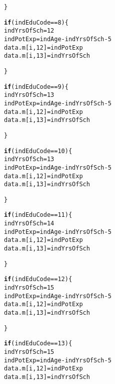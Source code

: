 \documentclass{article}\usepackage[]{graphicx}\usepackage[]{color}
\makeatletter
\newcommand{\hlnum}[1]{\textcolor[rgb]{0.686,0.059,0.569}{#1}}%
\newcommand{\hlopt}[1]{\textcolor[rgb]{0,0,0}{#1}}%
\newcommand{\hlstd}[1]{\textcolor[rgb]{0.345,0.345,0.345}{#1}}%
\newcommand{\hlkwa}[1]{\textcolor[rgb]{0.161,0.373,0.58}{\textbf{#1}}}%
\newcommand{\hlkwb}[1]{\textcolor[rgb]{0.69,0.353,0.396}{#1}}%
\newenvironment{kframe}{%
 \def\at@end@of@kframe{}%
 \ifinner\ifhmode%
  \def\at@end@of@kframe{\end{minipage}}%
  \begin{minipage}{\columnwidth}%
 \fi\fi%
 \def\FrameCommand##1{\hskip\@totalleftmargin \hskip-\fboxsep
 \colorbox{shadecolor}{##1}\hskip-\fboxsep
     \hskip-\linewidth \hskip-\@totalleftmargin \hskip\columnwidth}%
 \MakeFramed {\advance\hsize-\width
   \@totalleftmargin\z@ \linewidth\hsize
   \@setminipage}}%
 {\par\unskip\endMakeFramed%
 \at@end@of@kframe}
\newenvironment{knitrout}{}{} %
\makeatother
\begin{document}
\begin{knitrout}
\begin{kframe}
\begin{alltt}
    \hlstd{\}}

    \hlkwa{if} \hlstd{(indEduCode} \hlopt{==} \hlnum{8}\hlstd{)\{}
      \hlstd{indYrsOfSch} \hlkwb{=} \hlnum{12}
      \hlstd{indPotExp} \hlkwb{=} \hlstd{indAge} \hlopt{-} \hlstd{indYrsOfSch} \hlopt{-} \hlnum{5}
      \hlstd{data.m[i,}\hlnum{12}\hlstd{]} \hlkwb{=} \hlstd{indPotExp}
      \hlstd{data.m[i,}\hlnum{13}\hlstd{]} \hlkwb{=} \hlstd{indYrsOfSch}

    \hlstd{\}}

    \hlkwa{if} \hlstd{(indEduCode} \hlopt{==} \hlnum{9}\hlstd{)\{}
      \hlstd{indYrsOfSch} \hlkwb{=} \hlnum{13}
      \hlstd{indPotExp} \hlkwb{=} \hlstd{indAge} \hlopt{-} \hlstd{indYrsOfSch} \hlopt{-} \hlnum{5}
      \hlstd{data.m[i,}\hlnum{12}\hlstd{]} \hlkwb{=} \hlstd{indPotExp}
      \hlstd{data.m[i,}\hlnum{13}\hlstd{]} \hlkwb{=} \hlstd{indYrsOfSch}

    \hlstd{\}}

    \hlkwa{if} \hlstd{(indEduCode} \hlopt{==} \hlnum{10}\hlstd{)\{}
      \hlstd{indYrsOfSch} \hlkwb{=} \hlnum{13}
      \hlstd{indPotExp} \hlkwb{=} \hlstd{indAge} \hlopt{-} \hlstd{indYrsOfSch} \hlopt{-} \hlnum{5}
      \hlstd{data.m[i,}\hlnum{12}\hlstd{]} \hlkwb{=} \hlstd{indPotExp}
      \hlstd{data.m[i,}\hlnum{13}\hlstd{]} \hlkwb{=} \hlstd{indYrsOfSch}

    \hlstd{\}}

    \hlkwa{if} \hlstd{(indEduCode} \hlopt{==} \hlnum{11}\hlstd{)\{}
      \hlstd{indYrsOfSch} \hlkwb{=} \hlnum{14}
      \hlstd{indPotExp} \hlkwb{=} \hlstd{indAge} \hlopt{-} \hlstd{indYrsOfSch} \hlopt{-} \hlnum{5}
      \hlstd{data.m[i,}\hlnum{12}\hlstd{]} \hlkwb{=} \hlstd{indPotExp}
      \hlstd{data.m[i,}\hlnum{13}\hlstd{]} \hlkwb{=} \hlstd{indYrsOfSch}

    \hlstd{\}}

    \hlkwa{if} \hlstd{(indEduCode} \hlopt{==} \hlnum{12}\hlstd{)\{}
      \hlstd{indYrsOfSch} \hlkwb{=} \hlnum{15}
      \hlstd{indPotExp} \hlkwb{=} \hlstd{indAge} \hlopt{-} \hlstd{indYrsOfSch} \hlopt{-} \hlnum{5}
      \hlstd{data.m[i,}\hlnum{12}\hlstd{]} \hlkwb{=} \hlstd{indPotExp}
      \hlstd{data.m[i,}\hlnum{13}\hlstd{]} \hlkwb{=} \hlstd{indYrsOfSch}

    \hlstd{\}}

    \hlkwa{if} \hlstd{(indEduCode} \hlopt{==} \hlnum{13}\hlstd{)\{}
      \hlstd{indYrsOfSch} \hlkwb{=} \hlnum{15}
      \hlstd{indPotExp} \hlkwb{=} \hlstd{indAge} \hlopt{-} \hlstd{indYrsOfSch} \hlopt{-} \hlnum{5}
      \hlstd{data.m[i,}\hlnum{12}\hlstd{]} \hlkwb{=} \hlstd{indPotExp}
      \hlstd{data.m[i,}\hlnum{13}\hlstd{]} \hlkwb{=} \hlstd{indYrsOfSch}


\end{alltt}
\end{kframe}
\end{knitrout}
\end{document}
